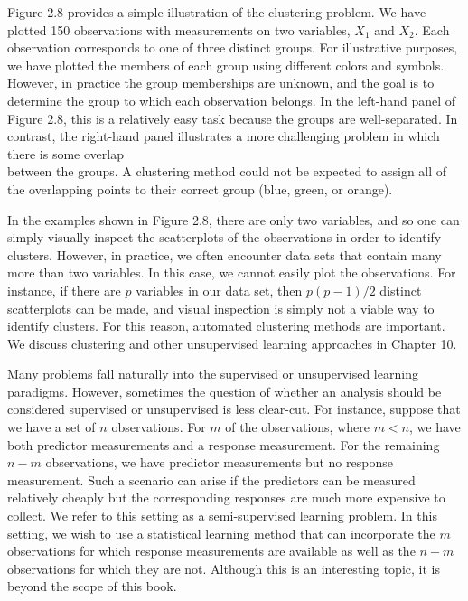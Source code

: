 \documentclass[10pt]{article}
\begin{document}
Figure 2.8 provides a simple illustration of the clustering problem. We have plotted 150 observations with measurements on two variables, $X_{1}$ and $X_{2}$. Each observation corresponds to one of three distinct groups. For illustrative purposes, we have plotted the members of each group using different colors and symbols. However, in practice the group memberships are unknown, and the goal is to determine the group to which each observation belongs. In the left-hand panel of Figure 2.8, this is a relatively easy task because the groups are well-separated. In contrast, the right-hand panel illustrates a more challenging problem in which there is some overlap\\
between the groups. A clustering method could not be expected to assign all of the overlapping points to their correct group (blue, green, or orange).

In the examples shown in Figure 2.8, there are only two variables, and so one can simply visually inspect the scatterplots of the observations in order to identify clusters. However, in practice, we often encounter data sets that contain many more than two variables. In this case, we cannot easily plot the observations. For instance, if there are $p$ variables in our data set, then $p(p-1) / 2$ distinct scatterplots can be made, and visual inspection is simply not a viable way to identify clusters. For this reason, automated clustering methods are important. We discuss clustering and other unsupervised learning approaches in Chapter 10.

Many problems fall naturally into the supervised or unsupervised learning paradigms. However, sometimes the question of whether an analysis should be considered supervised or unsupervised is less clear-cut. For instance, suppose that we have a set of $n$ observations. For $m$ of the observations, where $m<n$, we have both predictor measurements and a response measurement. For the remaining $n-m$ observations, we have predictor measurements but no response measurement. Such a scenario can arise if the predictors can be measured relatively cheaply but the corresponding responses are much more expensive to collect. We refer to this setting as a semi-supervised learning problem. In this setting, we wish to use a statistical learning method that can incorporate the $m$ observations for which response measurements are available as well as the $n-m$ observations for which they are not. Although this is an interesting topic, it is beyond the scope of this book.
\end{document}
